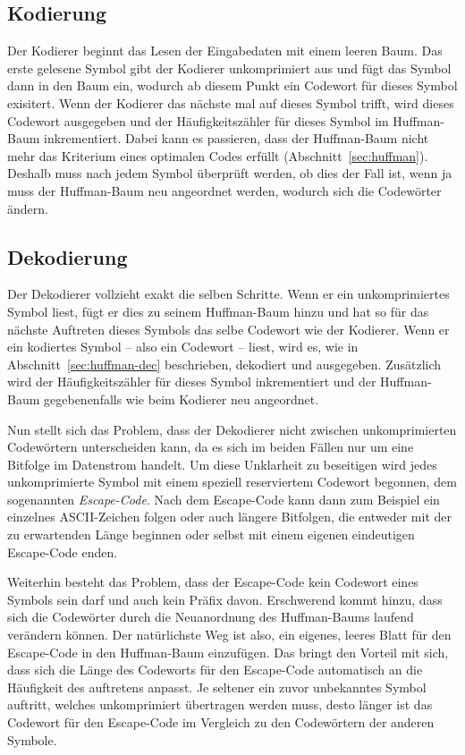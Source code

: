 \documentclass[twoside,11pt,a4paper]{article}
\theoremstyle{break}
\begin{document}

\subsection{Kodierung}

Der Kodierer beginnt das Lesen der Eingabedaten mit einem leeren
Baum. Das erste gelesene Symbol gibt der Kodierer unkomprimiert aus
und fügt das Symbol dann in den Baum ein, wodurch ab diesem Punkt ein
Codewort für dieses Symbol exisitert. Wenn der Kodierer das nächste
mal auf dieses Symbol trifft, wird dieses Codewort ausgegeben und der
Häufigkeitszähler für dieses Symbol im Huffman-Baum inkrementiert.
Dabei kann es passieren, dass der Huffman-Baum nicht mehr das
Kriterium eines optimalen Codes erfüllt (Abschnitt~\ref{sec:huffman}).
Deshalb muss nach jedem Symbol überprüft werden, ob dies der Fall ist,
wenn ja muss der Huffman-Baum neu angeordnet werden, wodurch sich die
Codewörter ändern.

\subsection{Dekodierung}

Der Dekodierer vollzieht exakt die selben Schritte. Wenn er ein
unkomprimiertes Symbol liest, fügt er dies zu seinem Huffman-Baum
hinzu und hat so für das nächste Auftreten dieses Symbols das selbe
Codewort wie der Kodierer. Wenn er ein kodiertes Symbol -- also ein
Codewort -- liest, wird es, wie in Abschnitt~\ref{sec:huffman-dec}
beschrieben, dekodiert und ausgegeben. Zusätzlich wird der
Häufigkeitszähler für dieses Symbol inkrementiert und der Huffman-Baum
gegebenenfalls wie beim Kodierer neu angeordnet.

Nun stellt sich das Problem, dass der Dekodierer nicht zwischen
unkomprimierten Codewörtern unterscheiden kann, da es sich im beiden
Fällen nur um eine Bitfolge im Datenstrom handelt. Um diese Unklarheit
zu beseitigen wird jedes unkomprimierte Symbol mit einem speziell
reserviertem Codewort begonnen, dem sogenannten \emph{Escape-Code}.
Nach dem Escape-Code kann dann zum Beispiel ein einzelnes
ASCII-Zeichen folgen oder auch längere Bitfolgen, die entweder mit der
zu erwartenden Länge beginnen oder selbst mit einem eigenen
eindeutigen Escape-Code enden.

Weiterhin besteht das Problem, dass der Escape-Code kein Codewort
eines Symbols sein darf und auch kein Präfix davon. Erschwerend kommt
hinzu, dass sich die Codewörter durch die Neuanordnung des
Huffman-Baums laufend verändern können. Der natürlichste Weg ist also,
ein eigenes, leeres Blatt für den Escape-Code in den Huffman-Baum
einzufügen. Das bringt den Vorteil mit sich, dass sich die Länge des
Codeworts für den Escape-Code automatisch an die Häufigkeit des
auftretens anpasst. Je seltener ein zuvor unbekanntes Symbol auftritt,
welches unkomprimiert übertragen werden muss, desto länger ist das
Codewort für den Escape-Code im Vergleich zu den Codewörtern der
anderen Symbole.
\end{document}
